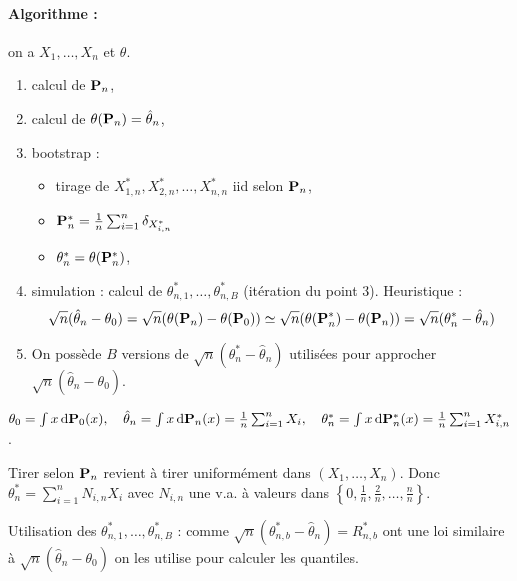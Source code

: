 	\paragraph{Algorithme :} on a $X_1,\ldots,X_n$ et $\theta$.
		\begin{enumerate}[1)]
			\item calcul de $\mathbf{P}_n$,
			\item calcul de $\theta(\mathbf{P}_n) = \hat{\theta}_n$,
			\item bootstrap :
				\begin{itemize}
					\item[\textbullet] tirage de $X_{1,n}^*,X_{2,n}^*,\ldots,X_{n,n}^*$ iid selon $\mathbf{P}_n$,
					\item[\textbullet] $\mathbf{P}_n^* = \frac{1}{n} \sum_{i = 1}^n \delta_{X_{i,n}^*}$
					\item[\textbullet] $\theta_n^* = \theta(\mathbf{P}_n^*)$,
				\end{itemize}
			\item simulation : calcul de $\theta_{n,1}^*,\ldots,\theta_{n,B}^*$ (itération du point 3).
				Heuristique :
				$$\sqrt{n}(\hat{\theta}_n - \theta_0) = \sqrt{n}(\theta(\mathbf{P}_n) - \theta(\mathbf{P}_0)) \simeq \sqrt{n}(\theta(\mathbf{P}_n^*) - \theta(\mathbf{P}_n)) = \sqrt{n}(\theta_n^* - \hat{\theta}_n)$$
			\item On possède $B$ versions de $\sqrt{n}(\theta_n^* - \hat{\theta}_n)$ utilisées pour approcher $\sqrt{n}(\hat{\theta}_n - \theta_0)$.
		\end{enumerate}

	\begin{ex}
		$\theta_0 = \int x \mathop{}\mathopen{}\mathrm{d} \mathbf{P}_0(x), \quad
			\hat{\theta}_n = \int x \mathop{}\mathopen{}\mathrm{d} \mathbf{P}_n(x) = \frac{1}{n} \sum_{i = 1}^n X_i, \quad
			\theta_n^* = \int x \mathop{}\mathopen{}\mathrm{d} \mathbf{P}_n^*(x) = \frac{1}{n} \sum_{i = 1}^n X_{i,n}^*$.
	\end{ex}

	\begin{rem}
		Tirer selon $\mathbf{P}_n$ revient à tirer uniformément dans $(X_1,\ldots,X_n)$.
		Donc $\theta_n^* = \sum_{i = 1}^n N_{i,n} X_i$ avec $N_{i,n}$ une v.a. à valeurs dans $\left\{ 0, \frac{1}{n}, \frac{2}{n}, \ldots, \frac{n}{n} \right\}$.
	\end{rem}

	Utilisation des $\theta_{n,1}^*,\ldots,\theta_{n,B}^*$ : comme $\sqrt{n} (\theta_{n,b}^* - \hat{\theta}_n) = R_{n,b}^*$ ont une loi similaire à $\sqrt{n}(\hat{\theta}_n - \theta_0)$ on les utilise pour calculer les quantiles.

